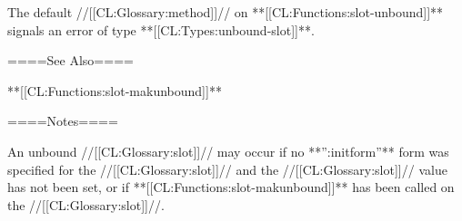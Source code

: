 The default //[[CL:Glossary:method]]// on **[[CL:Functions:slot-unbound]]** signals an error of type **[[CL:Types:unbound-slot]]**.


====See Also====

**[[CL:Functions:slot-makunbound]]**

====Notes====

An unbound //[[CL:Glossary:slot]]// may occur if no **'':initform''** form was specified for the //[[CL:Glossary:slot]]// and the //[[CL:Glossary:slot]]// value has not been set, or if **[[CL:Functions:slot-makunbound]]** has been called on the //[[CL:Glossary:slot]]//.


  

